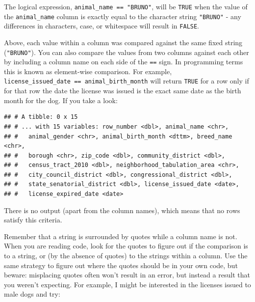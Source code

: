 \documentclass[]{Nemilov}
\newenvironment{Shaded}{\begin{snugshade}}{\end{snugshade}}
\newcommand{\KeywordTok}[1]{\textcolor[rgb]{0.13,0.29,0.53}{\textbf{#1}}}
\newcommand{\NormalTok}[1]{#1}
\newcommand{\OperatorTok}[1]{\textcolor[rgb]{0.81,0.36,0.00}{\textbf{#1}}}
\newcommand{\StringTok}[1]{\textcolor[rgb]{0.31,0.60,0.02}{#1}}
\begin{document}
The logical expression, \texttt{animal\_name\ ==\ "BRUNO"}, will be \texttt{TRUE} when the value of the \texttt{animal\_name} column is exactly equal to the character string \texttt{"BRUNO"} - any differences in characters, case, or whitespace will result in \texttt{FALSE}.

Above, each value within a column was compared against the same fixed string (\texttt{"BRUNO"}). You can also compare the values from two columns against each other by including a column name on each side of the \texttt{==} sign. In programming terms this is known as element-wise comparison. For example, \texttt{license\_issued\_date\ ==\ animal\_birth\_month} will return \texttt{TRUE} for a row only if for that row the date the license was issued is the exact same date as the birth month for the dog. If you take a look:

\begin{Shaded}
\end{Shaded}

\begin{verbatim}
## # A tibble: 0 x 15
## # ... with 15 variables: row_number <dbl>, animal_name <chr>,
## #   animal_gender <chr>, animal_birth_month <dttm>, breed_name <chr>,
## #   borough <chr>, zip_code <dbl>, community_district <dbl>,
## #   census_tract_2010 <dbl>, neighborhood_tabulation_area <chr>,
## #   city_council_district <dbl>, congressional_district <dbl>,
## #   state_senatorial_district <dbl>, license_issued_date <date>,
## #   license_expired_date <date>
\end{verbatim}

There is no output (apart from the column names), which means that no rows satisfy this criteria.

Remember that a string is surrounded by quotes while a column name is not. When you are reading code, look for the quotes to figure out if the comparison is to a string, or (by the absence of quotes) to the strings within a column. Use the same strategy to figure out where the quotes should be in your own code, but beware: misplacing quotes often won't result in an error, but instead a result that you weren't expecting. For example, I might be interested in the licenses issued to male dogs and try:
\end{document}
